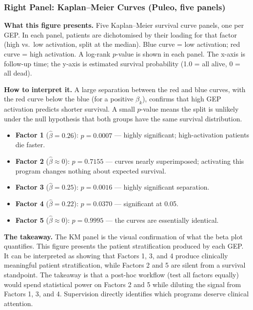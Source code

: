 \documentclass[11pt]{article}
\begin{document}
\subsubsection*{Right Panel: Kaplan--Meier Curves (Puleo, five panels)}

\textbf{What this figure presents.} Five Kaplan--Meier survival curve panels, one per GEP. In each panel, patients are dichotomised by their loading for that factor (high vs.\ low activation, split at the median). Blue curve = low activation; red curve = high activation. A log-rank $p$-value is shown in each panel. The x-axis is follow-up time; the y-axis is estimated survival probability (1.0 = all alive, 0 = all dead).

\textbf{How to interpret it.} A large separation between the red and blue curves, with the red curve below the blue (for a positive $\beta_k$), confirms that high GEP activation predicts shorter survival. A small $p$-value means the split is unlikely under the null hypothesis that both groups have the same survival distribution.

\begin{itemize}
  \item \textbf{Factor 1} ($\hat{\beta} = 0.26$): $p = 0.0007$ --- highly significant; high-activation patients die faster.
  \item \textbf{Factor 2} ($\hat{\beta} \approx 0$): $p = 0.7155$ --- curves nearly superimposed; activating this program changes nothing about expected survival.
  \item \textbf{Factor 3} ($\hat{\beta} = 0.25$): $p = 0.0016$ --- highly significant separation.
  \item \textbf{Factor 4} ($\hat{\beta} = 0.22$): $p = 0.0370$ --- significant at 0.05.
  \item \textbf{Factor 5} ($\hat{\beta} \approx 0$): $p = 0.9995$ --- the curves are essentially identical.
\end{itemize}

\textbf{The takeaway.} The KM panel is the visual confirmation of what the beta plot quantifies. This figure presents the patient stratification produced by each GEP. It can be interpreted as showing that Factors 1, 3, and 4 produce clinically meaningful patient stratification, while Factors 2 and 5 are silent from a survival standpoint. The takeaway is that a post-hoc workflow (test all factors equally) would spend statistical power on Factors 2 and 5 while diluting the signal from Factors 1, 3, and 4. Supervision directly identifies which programs deserve clinical attention.
\end{document}
